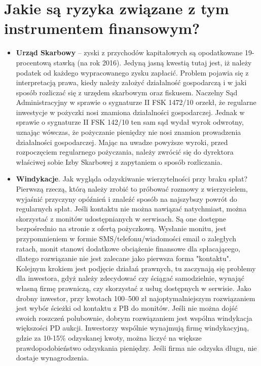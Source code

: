\documentclass[a4paper,twoside,titlepage,openright]{book}
\begin{document}
 
\section{Jakie są ryzyka związane z tym instrumentem finansowym?}

\begin{itemize}

\item \textbf{Urząd Skarbowy} -- zyski z przychodów kapitałowych są opodatkowane 19-procentową stawką (na rok 2016). Jedyną jasną kwestią tutaj jest, iż należy podatek od każdego wypracowanego zysku zapłacić. Problem pojawia się z interpretacją prawa, kiedy należy założyć działalność gospodarczą i w jaki sposób rozliczać się z urzędem skarbowym oraz fiskusem. Naczelny Sąd Administracyjny w sprawie o sygnaturze II FSK 1472/10 orzekł, że regularne inwestycje w pożyczki nosi znamiona działalności gospodarczej.\cite{nsaZnamiona} Jednak w sprawie o sygnaturze II FSK 142/10 ten sam sąd wydał wyrok odwrotny, uznając wówczas, że pożyczanie pieniędzy nie nosi znamion prowadzenia działalności gospodarczej. \cite{nsaWyrokOdwrotny} Mając na uwadze powyższe wyroki, przed rozpoczęciem regularnego pożyczania, należy zwrócić się do dyrektora właściwej sobie Izby Skarbowej z zapytaniem o sposób rozliczania. \cite{oswiadczenieKokos}

\item \textbf{Windykacje}. Jak wygląda odzyskiwanie wierzytelności przy braku spłat? Pierwszą rzeczą, którą należy zrobić to próbować rozmowy z wierzycielem, wyjaśnić przyczyny opóźnień i znaleźć sposób na najszybszy powrót do regularnych spłat. Jeśli kontaktu nie można nawiązać natychmiast, można skorzystać z monitów udostępnianych w serwisach. Są one dostępne bezpośrednio na stronie z ofertą pożyczkową. Wysłanie monitu, jest przypomnieniem w formie SMS/telefonu/wiadomości email o zaległych ratach, monit stanowi dodatkowe obciążenie finansowe dla spłacającego, dlatego rozwiązanie nie jest zalecane jako pierwsza forma "kontaktu". Kolejnym krokiem jest podjęcie działań prawnych, tu zaczynają się problemy dla inwestora, gdyż należy zdecydować czy ściągać samodzielnie, wynająć własną firmę prawniczą, czy skorzystać z usług dostępnych w serwisie. Jako drobny inwestor, przy kwotach 100--500 zł najoptymalniejszym rozwiązaniem jest wybór ścieżki od kontaktu z PB do monitów. Jeśli nie można dojść swoich roszczeń polubownie, dobrym rozwiązaniem jest wspólna windykacja większości PD aukcji. Inwestorzy wspólnie wynajmują firmę windykacyjną, gdzie za 10-15\% odzyskanej kwoty, można liczyć na większe prawdopodobieństwo odzyskania pieniędzy. Jeśli firma nie odzyska długu, nie dostaje wynagrodzenia.

\end{itemize}
\end{document}
